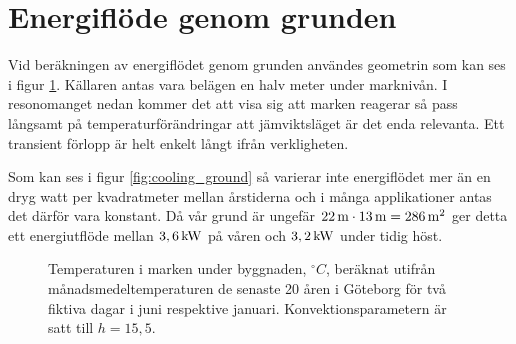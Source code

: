 \section{Energiflöde genom grunden}

% 
% 


Vid beräkningen av energiflödet genom grunden användes geometrin som kan ses i figur \ref{fig:groundheat}. Källaren antas vara belägen en halv meter under marknivån. I resonomanget nedan kommer det att visa sig att marken reagerar så pass långsamt på temperaturförändringar att jämviktsläget är det enda relevanta. Ett transient förlopp är helt enkelt långt ifrån verkligheten.

Som kan ses i figur \ref{fig:cooling_ground} så varierar inte energiflödet mer än en dryg watt per kvadratmeter mellan årstiderna och i många applikationer antas det därför vara konstant. Då vår grund är ungefär $\unit[22]{m}\cdot\unit[13]{m}=\unit[286]{m^2}$ ger detta ett energiutflöde mellan $\unit[3,6]{kW}$ på våren och $\unit[3,2]{kW}$ under tidig höst. 

\begin{figure}
\centering
{}
\caption{\label{fig:groundheat}
Temperaturen i marken under byggnaden, $\unit{^\circ C}$, beräknat utifrån månadsmedeltemperaturen de senaste 20 åren i Göteborg för två fiktiva dagar i juni respektive januari. Konvektionsparametern är satt till $h=15,5$. }
\end{figure}



